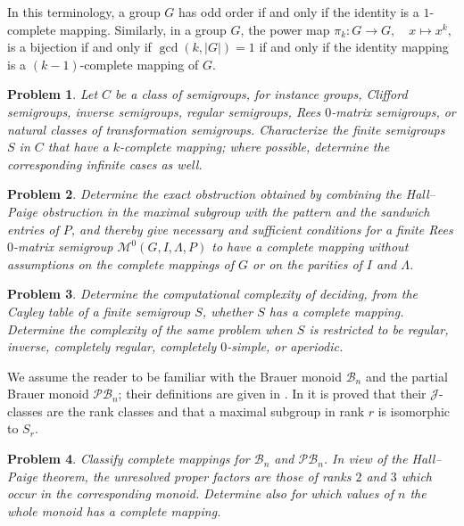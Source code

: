 \documentclass[11pt]{article}
\theoremstyle{plain}
\newtheorem{problem}{Problem}[section]
\theoremstyle{remark}
\theoremstyle{definition}
\theoremstyle{plain}
\begin{document}
In this terminology, a group $G$ has odd order if and only if the identity is a $1$-complete mapping. Similarly, in a group $G$, the power map
\(\pi_k\colon G\to G,\quad x\mapsto x^k,\)
is a bijection if and only if $\gcd(k,|G|)=1$ if and only if the identity mapping is a $(k-1)$-complete mapping of $G$.

\begin{problem}
Let $C$ be a class of semigroups, for instance groups, Clifford semigroups,
inverse semigroups, regular semigroups, Rees $0$-matrix semigroups, or natural
classes of transformation semigroups. Characterize the finite semigroups $S$ in
$C$ that have a $k$-complete mapping; where possible, determine the
corresponding infinite cases as well.
\end{problem}

\begin{problem}\label{p:Rees0-full-classification}
{Determine the exact obstruction obtained by combining the
Hall--Paige obstruction in the maximal subgroup with the pattern and the
sandwich entries of $P$, and thereby give necessary and sufficient conditions
for a finite Rees $0$-matrix semigroup $\mathcal M^0(G,I,\Lambda,P)$ to
have a complete mapping without assumptions on the complete mappings of $G$
or on the parities of $I$ and $\Lambda$.}
\end{problem}

\begin{problem}\label{p:complexity-complete-mapping}
Determine the computational complexity of deciding, from the Cayley table of a
finite semigroup $S$, whether $S$ has a complete mapping. Determine the
complexity of the same problem when $S$ is restricted to be regular, inverse,
completely regular, completely $0$-simple, or aperiodic.
\end{problem}

{
We assume the reader to be familiar with the Brauer monoid $\mathcal B_n$
and the partial Brauer monoid $\mathcal{PB}_n$; their definitions are given
in \cite[Section~2.2]{EastMitchellRuskucTorpey}. In
\cite[Proposition~2.1 and Remark~2.2(v)--(vii)]
{EastMitchellRuskucTorpey} it is proved that their $\mathcal J$-classes are
the rank classes and that a maximal subgroup in rank $r$ is isomorphic to
$S_r$.

\begin{problem}\label{p:diagram-monoids}
Classify complete mappings for $\mathcal B_n$ and $\mathcal{PB}_n$. In view
of the Hall--Paige theorem, the unresolved proper factors are those of ranks
$2$ and $3$ which occur in the corresponding monoid. Determine also for
which values of $n$ the whole monoid has a complete mapping.
\end{problem}
}
\end{document}

